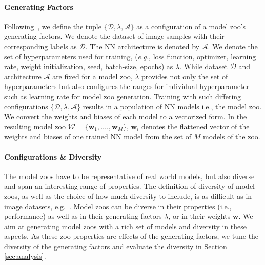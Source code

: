 \paragraph{Generating Factors}
Following~\citep{unterthinerPredictingNeuralNetwork2020}, we define the tuple $\{ \mathcal{D}, \lambda,  \mathcal{A}\}$ as a configuration of a model 
zoo's generating factors. We denote the dataset of image samples with their corresponding labels  as $\mathcal{D}$. 
The NN architecture is denoted by $\mathcal{A}$.
We denote the set of hyperparameters used for training, (\textit{e.g.}, loss function, optimizer, learning rate, weight initialization, seed, batch-size, epochs) as $\lambda$. 
While dataset $\mathcal{D}$ and architecture $\mathcal{A}$ are fixed for a model zoo, $\lambda$ provides not only the set of hyperparameters but also configures the ranges for individual hyperparameter such as learning rate for model zoo generation.
%
Training with such differing configurations $\{\mathcal{D}, \lambda,  \mathcal{A}\}$ results 
in a population of NN models i.e., the model zoo. We convert the weights and biases of each model 
to a vectorized form. In the resulting model zoo $\mathcal{W} = \{ {\textbf{w}}_1, ...., {\textbf{w}}_M \}$, ${\textbf{w}}_i$ 
denotes the flattened vector of the weights and biases of one trained 
NN model from the set of $M$ models of the zoo. 

\vspace{-3pt}
\paragraph{Configurations \& Diversity}
The model zoos have to be representative of real world models, but also diverse and span an interesting range of properties.
The definition of diversity of model zoos, as well as the choice of how much diversity to include, 
is as difficult as in image datasets, e.g.~\citep{dengImageNetLargeScaleHierarchical,feiConstructionAnalysisLarge}.
Model zoos can be diverse in their properties (i.e., performance) as well as in their generating factors $\lambda$, or in their weights $\textbf{w}$. 
We aim at generating model zoos with a rich set of models and diversity in these aspects.
As these zoo properties are effects of the generating factors, we tune the diversity of the generating factors 
and evaluate the diversity in Section \ref{sec:analysis}.

